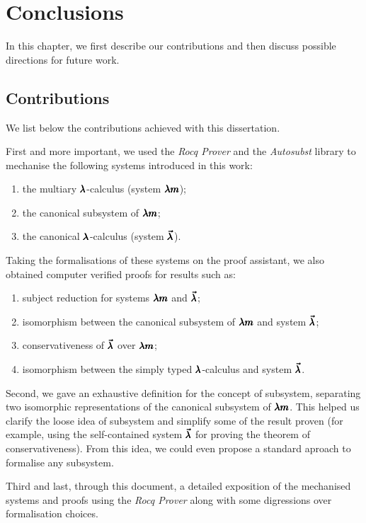 \chapter{Conclusions}
\label{c:conclusions}

In this chapter, we first describe our contributions and then discuss possible directions for future work.

\section{Contributions}

We list below the contributions achieved with this dissertation.

First and more important, we used the \textit{Rocq Prover} and the \textit{Autosubst} library to mechanise the following systems introduced in this work:
\begin{enumerate}
\item the multiary $\pmb{\lambda}$-calculus (system $\pmb{\lambda m}$);
\item the canonical subsystem of $\pmb{\lambda m}$;
\item the canonical $\pmb{\lambda}$-calculus (system $\pmb{\vec \lambda}$).
\end{enumerate}
Taking the formalisations of these systems on the proof assistant, we also obtained computer verified proofs for results such as:
\begin{enumerate}
\item subject reduction for systems $\pmb{\lambda m}$ and $\pmb{\vec \lambda}$;
\item isomorphism between the canonical subsystem of $\pmb{\lambda m}$ and system $\pmb{\vec \lambda}$;
\item conservativeness of $\pmb{\vec \lambda}$ over $\pmb{\lambda m}$;
\item isomorphism between the simply typed $\pmb{\lambda}$-calculus and system $\pmb{\vec \lambda}$.
\end{enumerate}

Second, we gave an exhaustive definition for the concept of subsystem, separating two isomorphic representations of the canonical subsystem of $\pmb{\lambda m}$.
This helped us clarify the loose idea of subsystem and simplify some of the result proven (for example, using the self-contained system $\pmb{\vec \lambda}$ for proving the theorem of conservativeness).
From this idea, we could even propose a standard aproach to formalise any subsystem.

Third and last, through this document, a detailed exposition of the mechanised systems and proofs using the \textit{Rocq Prover} along with some digressions over formalisation choices.

